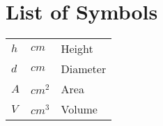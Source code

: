 \clearpage
\chapter*{List of Symbols}


\begin{tabular}{lll}
    $h$     & $cm$      & Height\\
    $d$     & $cm$      & Diameter\\
    $A$     & $cm^2$    & Area\\
    $V$     & $cm^3$    & Volume
\end{tabular}
